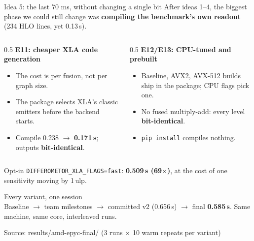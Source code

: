 \documentclass[aspectratio=169,11pt]{beamer}
\newcommand{\hl}[1]{\textcolor{accent}{\textbf{#1}}}
\newcommand{\ok}[1]{\textcolor{good}{\textbf{#1}}}
\newcommand{\src}[1]{\par\vfill{\color{muted}\scriptsize Source: #1}}
\begin{document}
\begin{frame}{Idea 5: the last 70 ms, without changing a single bit}
  After ideas 1--4, the biggest phase we could still change was \hl{compiling the benchmark's own readout} (234 HLO lines, yet 0.13\,s).
  \vspace{0.4em}
  \begin{columns}[T]
    \begin{column}{0.5\textwidth}
      \textbf{E11: cheaper XLA code generation}
      \begin{itemize}
        \item The cost is per fusion, not per graph size.
        \item The package selects XLA's classic emitters before the backend starts.
        \item Compile 0.238 $\to$ \textbf{0.171\,s}; outputs \ok{bit-identical}.
      \end{itemize}
    \end{column}
    \begin{column}{0.5\textwidth}
      \textbf{E12/E13: CPU-tuned and prebuilt}
      \begin{itemize}
        \item Baseline, AVX2, AVX-512 builds ship in the package; CPU flags pick one.
        \item No fused multiply-add: every level \ok{bit-identical}.
        \item \texttt{pip install} compiles nothing.
      \end{itemize}
    \end{column}
  \end{columns}
  \vspace{0.6em}
  {\small Opt-in \texttt{DIFFEROMETOR\_XLA\_FLAGS=fast}: \textbf{0.509\,s (69$\times$)}, at the cost of one sensitivity moving by 1\,ulp.}
\end{frame}

\begin{frame}{Every variant, one session}
  \centering
  \\[0.3em]
  {\small Baseline $\to$ team milestones $\to$ committed v2 (0.656\,s) $\to$ final \textbf{0.585\,s}. Same machine, same core, interleaved runs.}
  \src{results/amd-epyc-final/ (3 runs $\times$ 10 warm repeats per variant)}
\end{frame}
\end{document}
